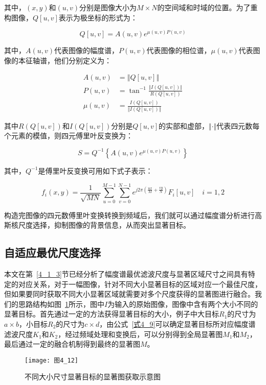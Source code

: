 其中，$(x,y)$和$(u,v)$分别是图像大小为$M×N$的空间域和时域的位置。为了重构图像，$Q[u,v]$表示为极坐标的形式为：
\begin{linenomath}
\begin{equation}
  \label{式4_19}
  Q[u,v]=A(u,v)e^{\mu(u,v) P(u,v)}
\end{equation}
\end{linenomath}
其中，$A(u,v)$代表图像的幅度谱，$P(u,v)$代表图像的相位谱，$\mu(u,v)$代表图像的本征轴谱，他们分别定义为：
\begin{linenomath}
\begin{align}
A(u,v) &= \left\Vert Q[u,v] \right\Vert \label{式4_20}\\
P(u,v) &= \tan^{-1}\frac{\left\Vert I\left(Q[u,v]\right)\right\Vert}{R\left(Q[u,v]\right)} \label{式4_21}\\
\mu(u,v) &= \frac{I\left(Q[u,v]\right)}{\left\Vert I\left(Q[u,v]\right)\right\Vert} \label{式4_22}
\end{align}
\end{linenomath}
其中$R\left(Q[u,v]\right)$和$I\left(Q[u,v]\right)$分别是$Q[u,v]$的实部和虚部，$\Vert\cdot\Vert$代表四元数每个元素的模值，则四元傅里叶反变换为：
\begin{linenomath}
\begin{equation}
  \label{式4_23}
  S=Q^{-1}\left\{A(u,v)e^{\mu(u,v)P(u,v)}\right\}
\end{equation}
\end{linenomath}
其中，$Q^{-1}$是傅里叶反变换可用如下式子表示：
\begin{linenomath}
\begin{equation}
f_i(x,y) = \frac{1}{\sqrt{MN}}\sum_{u=0}^{M-1}\sum_{v=0}^{N-1}e^{j 2\pi\left(\frac{ux}{M}+\frac{vy}{N}\right)}F_{i}[u,v]\quad i=1,2  
\label{式4_24}
\end{equation}
\end{linenomath}
构造完图像的四元数傅里叶变换转换到频域后，我们就可以通过幅度谱分析进行高斯核尺度选择，抑制图像的背景信息，从而突出显著目标。

\subsection{自适应最优尺度选择}
\label{4_2_2}

本文在第~\ref{4_1_3}节已经分析了幅度谱最优滤波尺度与显著区域尺寸之间具有特定的对应关系，对于一幅图像，针对不同大小显著目标的区域对应一个最佳尺度，但如果要同时获取不同大小显著区域就需要对多个尺度获得的显著图进行融合。我们的思路结构如图~\ref{图4_12}所示，图中$I$为输入的原始图像，图像中含有两个大小不同的显著目标。首先通过一定的方法获得显著目标的大小，例子中大目标$R_{1}$的尺寸为$a\times b$，小目标$R_{2}$的尺寸为$c\times d$，由公式~\ref{式4_9}可以确定显著目标所对应幅度谱滤波尺度$K_{1}$和$K_{2}$，经过频域处理和变换后，可以分别得到全局显著图$M_{1}$和$M_{2}$，最后通过一定的融合机制得到最终的显著图$M$。
\begin{figure}[h]
  \centering
  \texttt{[image: 图4\_12]}
  \caption{不同大小尺寸显著目标的显著图获取示意图}   
  \label{图4_12} 
\end{figure}

